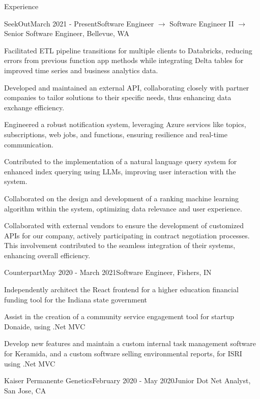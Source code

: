 \documentclass{resume} %
\begin{document}
\begin{rSection}{Experience}
    \begin{rSubsection}{SeekOut}{March 2021 - Present}{Software Engineer $\rightarrow$ Software Engineer 
 II $\rightarrow$ Senior Software Engineer, Bellevue, WA}

        \item Facilitated ETL pipeline transitions for multiple clients to Databricks, reducing errors from previous function app methods while integrating Delta tables for improved time series and business analytics data.
        \item Developed and maintained an external API, collaborating closely with partner companies to tailor solutions to their specific needs, thus enhancing data exchange efficiency.
        \item Engineered a robust notification system, leveraging Azure services like topics, subscriptions, web jobs, and functions, ensuring resilience and real-time communication.
        \item Contributed to the implementation of a natural language query system for enhanced index querying using LLMs, improving user interaction with the system.
        \item Collaborated on the design and development of a ranking machine learning algorithm within the system, optimizing data relevance and user experience.
        \item Collaborated with external vendors to ensure the development of customized APIs for our company, actively participating in contract negotiation processes. This involvement contributed to the seamless integration of their systems, enhancing overall efficiency.
        \end{rSubsection}
\begin{rSubsection}{Counterpart}{May 2020 - March 2021}{Software Engineer, Fishers, IN}

    \item Independently architect the React frontend for a higher education financial funding tool for the Indiana state government
    \item Assist in the creation of a community service engagement tool for startup Donaide, using .Net MVC
    \item Develop new features and maintain a custom internal task management software for Keramida, and a custom software selling environmental reports, for ISRI using .Net MVC
    \end{rSubsection}
\begin{rSubsection}{Kaiser Permanente Genetics}{February 2020 - May 2020}{Junior Dot Net Analyst, San Jose, CA}


\end{rSubsection}
\end{rSection}
\end{document}
